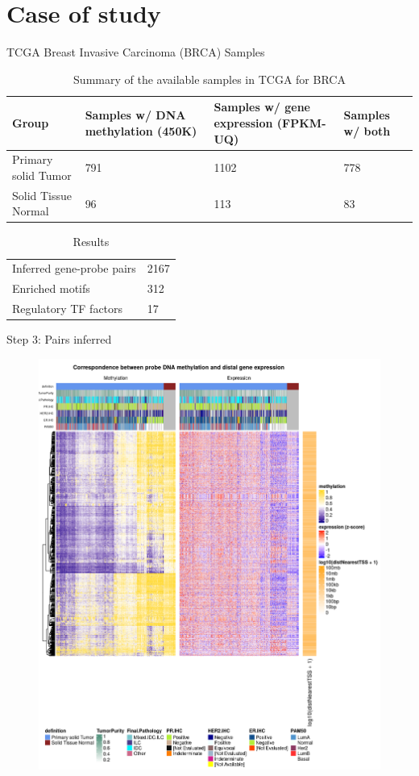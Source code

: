 \documentclass[slidestop,compress,11pt,xcolor=dvipsnames]{beamer}
\begin{document}
\section{Case of study}


\begin{frame}{TCGA Breast Invasive Carcinoma (BRCA) Samples}
 \begin{table}[ht!]
  \centering
  \caption{Summary of the available samples in TCGA for BRCA}
  \scriptsize

  \begin{tabular}{p{2.3cm}p{2.4cm}p{2.4cm}p{1cm}}
   \toprule
   Group               & Samples w/ DNA methylation (450K) & Samples w/ gene expression (FPKM-UQ) & Samples w/ both \\ \midrule
   Primary solid Tumor & 791                               & 1102                                 & 778             \\
   Solid Tissue Normal & 96                                & 113                                  & 83              \\
   \bottomrule
  \end{tabular}
 \end{table}

 \begin{table}[ht!]
  \centering
  \caption{Results}
  \scriptsize

  \begin{tabular}{p{2.8cm}p{2.4cm}}
   \toprule
   Inferred gene-probe pairs & 2167 \\
   Enriched motifs           & 312  \\
   Regulatory TF factors     & 17   \\
   \bottomrule
  \end{tabular}
 \end{table}
\end{frame}


\begin{frame}{Step 3: Pairs inferred}
\vspace*{-0.3cm}
\begin{figure}
 \centering
   \includegraphics[width=0.6\linewidth]{ELMER/BRCA_heatmap.png}
   \end{figure}
\end{frame}
\end{document}

